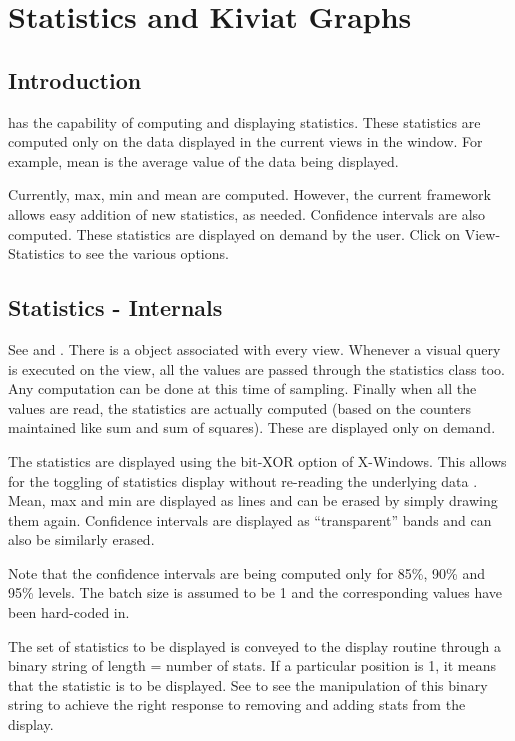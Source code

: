 \section{Statistics and Kiviat Graphs}

\subsection{Introduction}

\Devise has the capability of computing and displaying
statistics. These statistics are computed only on the data displayed
in the current views in the window. For example, mean is the average
 value of the data being displayed.

Currently, max, min and mean are computed.  However, the current
framework allows easy addition of new statistics, as needed.
Confidence intervals are also computed. These statistics are displayed
on demand by the user.  Click on View-Statistics to see the various
options.

\subsection{Statistics - Internals}

See  and .  There
is a  object associated with every view. Whenever a
visual query is executed on the view, all the  values
are passed through the statistics class too.  Any computation can be
done at this time of sampling. Finally when all the 
values are read, the statistics are actually computed (based on the
counters maintained like sum and sum of squares). These are displayed
only on demand.

The statistics are displayed using the bit-XOR option of
X-Windows. This allows for the toggling of statistics display without
re-reading the underlying data . Mean, max and min are displayed as
lines and can be erased by simply drawing them again. Confidence
intervals are displayed as ``transparent'' bands and can also be
similarly erased.

Note that the confidence intervals are being computed only for 85\%,
90\% and 95\% levels. The batch size is assumed to be 1 and the
corresponding  values have been hard-coded in.

The set of statistics to be displayed is conveyed to the display
routine through a binary string of length = number of stats. If a
particular position is 1, it means that the statistic is to be
displayed.  See  to see the manipulation of
this binary string to achieve the right response to removing and
adding stats from the display.


